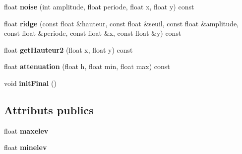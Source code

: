 \begin{DoxyCompactItemize}
\item 
\hypertarget{class_terrain_a8a14808fef57ab36080e77910c61544b}{}float {\bfseries noise} (int amplitude, float periode, float x, float y) const \label{class_terrain_a8a14808fef57ab36080e77910c61544b}

\item 
\hypertarget{class_terrain_a84e9ff5c165844d8bb26efbd2bd029d9}{}float {\bfseries ridge} (const float \&hauteur, const float \&seuil, const float \&amplitude, const float \&periode, const float \&x, const float \&y) const \label{class_terrain_a84e9ff5c165844d8bb26efbd2bd029d9}

\item 
\hypertarget{class_terrain_aed0bb23fb687495e00e91f54283eb767}{}float {\bfseries get\+Hauteur2} (float x, float y) const \label{class_terrain_aed0bb23fb687495e00e91f54283eb767}

\item 
\hypertarget{class_terrain_ae59f81bf5d7408f64e58b24ea6e2a203}{}float {\bfseries attenuation} (float h, float min, float max) const \label{class_terrain_ae59f81bf5d7408f64e58b24ea6e2a203}

\item 
\hypertarget{class_terrain_a3897ca64fd2bb90a4fbeae7b6f6d5244}{}void {\bfseries init\+Final} ()\label{class_terrain_a3897ca64fd2bb90a4fbeae7b6f6d5244}

\end{DoxyCompactItemize}
\subsection*{Attributs publics}
\begin{DoxyCompactItemize}
\item 
\hypertarget{class_terrain_a49eebc3b1863f016b9a0557f8467d9b9}{}float {\bfseries maxelev}\label{class_terrain_a49eebc3b1863f016b9a0557f8467d9b9}

\item 
\hypertarget{class_terrain_a7f748a933d74953ecfe6db43c0032c0f}{}float {\bfseries minelev}\label{class_terrain_a7f748a933d74953ecfe6db43c0032c0f}

\end{DoxyCompactItemize}
